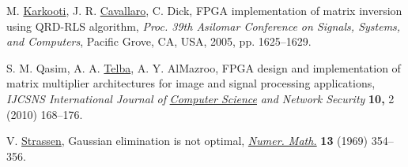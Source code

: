 \documentclass[11pt,twoside]{article}
\begin{document}
\begin{thebibliography}{99}
 M. \href{http://www.ece.rice.edu/~marjan/}{Karkooti}, J. R. \href{http://www.ece.rice.edu/~cavallar/}{Cavallaro}, C. Dick, FPGA implementation of matrix inversion using QRD-RLS algorithm, \emph{Proc. 39th Asilomar Conference on Signals, Systems, and Computers}, Pacific Grove, CA, USA, 2005, pp. 1625--1629.

 S. M. Qasim, A. A. \href{http://faculty.ksu.edu.sa/atelba/}{Telba}, A. Y. AlMazroo, FPGA design and implementation of matrix multiplier architectures for image and signal processing applications, \emph{IJCSNS International Journal of} \href{http://www.ijcsns.org/}{\textit{Computer Science}} \emph{and Network Security}  \textbf{10,} 2 (2010) 168--176.

 V. \href{http://www.math.uni-konstanz.de/~strassen/}{Strassen}, Gaussian elimination is not optimal, \href{http://www.springer.com/mathematics/numerical+and+computational+mathematics/journal/211}{\textit{Numer. Math.}} \textbf{13} (1969) 354--356.

\end{thebibliography}

\bigskip
{} 
\end{document}
